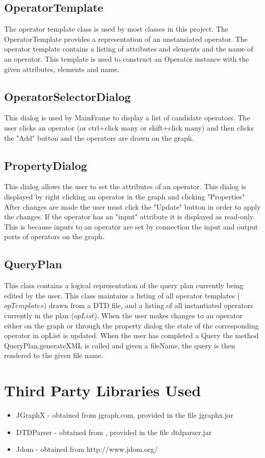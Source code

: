 \documentclass{article}
\begin{document}
\subsection{OperatorTemplate}  The operator template class is used by most classes in this project.  The OperatorTemplate provides a representation of an unstansiated operator.  The operator template contains a listing of attributes and elements and the name of an operator.  This template is used to construct an Operator instance with the given attributes, elements and name.
\subsection{OperatorSelectorDialog} This dialog is used by MainFrame to display a list of candidate operators.  The user clicks an operator (or ctrl+click many or shift+click many) and then clicks the "Add" button and the operators are drawn on the graph.
\subsection{PropertyDialog} This dialog allows the user to set the attributes of an operator.  This dialog is displayed by right clicking an operator in the graph and clicking "Properties"  After changes are made the user must click the "Update" button in order to apply the changes.  If the operator has an "input" attribute it is displayed as read-only.  This is because inputs to an operator are set by connection the input and output ports of operators on the graph.
\subsection{QueryPlan}  This class contains a logical representation of the query plan currently being edited by the user.  This class maintains a listing of all operator templates ($opTemplates$) drawn from a DTD file, and a listing of all instantiated operators currently in the plan ($opList$).  When the user makes changes to an operator either on the graph or through the property dialog the state of the corresponding operator in opList is updated.  When the user has completed a Query the method QueryPlan.generateXML is called and given a fileName, the query is then rendered to the given file name.
\section{Third Party Libraries Used}
\begin{itemize}
\item JGraphX - obtained from jgraph.com, provided in the file jgraphx.jar
\item DTDParser - obtained from  , provided in the file dtdparser.jar
\item Jdom - obtained from http://www.jdom.org/
\end{itemize}
\end{document}
